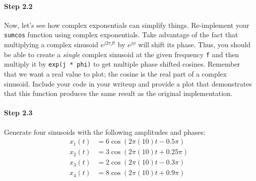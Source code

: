 \paragraph{Step 2.2} Now, let's see how complex exponentials can
simplify things. Re-implement your \texttt{sumcos} function using
complex exponentials. Take advantage of the fact that multiplying a
complex sinusoid $e^{j2\pi f t}$ by $e^{j\phi}$ will shift its
phase. Thus, you should be able to create a \emph{single} complex
sinusoid at the given frequency \texttt{f} and then multiply it by
\texttt{exp(j * phi)} to get multiple phase shifted cosines. Remember
that we want a real value to plot; the cosine is the real part of a
complex sinusoid. Include your code in your writeup and provide a plot
that demonstrates that this function produces the same result as the
original implementation.


\paragraph{Step 2.3} Generate four sinusoids with the following
amplitudes and phases:
\begin{align}
x_1(t) &= 6 \cos(2\pi(10)t - 0.5\pi) \\
x_2(t) &= 3 \cos(2\pi(10)t + 0.25\pi) \\
x_3(t) &= 2 \cos(2\pi(10)t - 0.3\pi) \\
x_4(t) &= 8 \cos(2\pi(10)t + 0.9\pi) 
\end{align}


